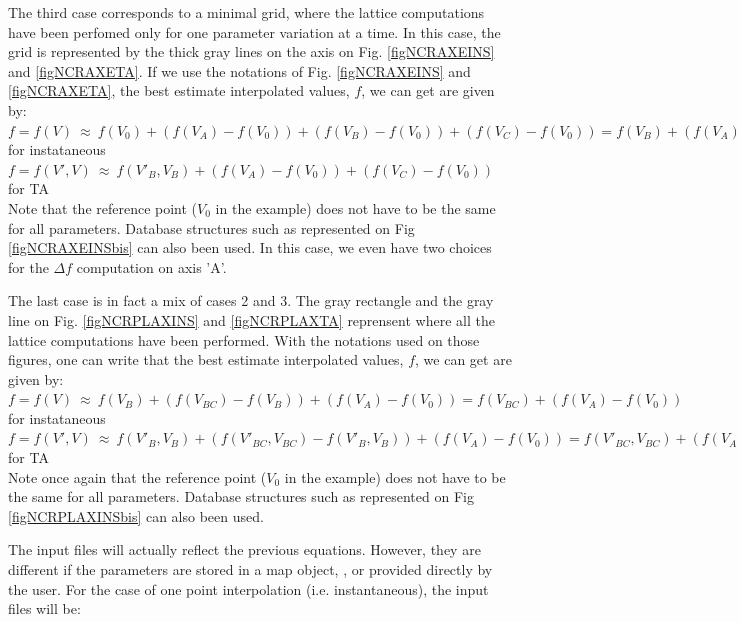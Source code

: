 The third case corresponds to a minimal grid, where the lattice computations have been perfomed only for one parameter variation at a time. In this case, the grid is represented by the thick gray lines on the axis on Fig. \ref{figNCRAXEINS} and \ref{figNCRAXETA}. If we use the notations of Fig. \ref{figNCRAXEINS} and \ref{figNCRAXETA}, the best estimate interpolated values, $f$, we can get are given by: \\
$f=f(V)~\approx~f(V_0)+(f(V_A)-f(V_0))+(f(V_B)-f(V_0))+(f(V_C)-f(V_0))=f(V_B)+(f(V_A)-f(V_0))+(f(V_C)-f(V_0))$ for instataneous\\
$f=f(V',V)~\approx~f(V'_B,V_B)+(f(V_A)-f(V_0))+(f(V_C)-f(V_0))$ for TA\\
Note that the reference point ($V_0$ in the example) does not have to be the same for all parameters. Database structures such as represented on Fig \ref{figNCRAXEINSbis} can also been used. In this case, we even have two choices for the $\Delta f$ computation on axis 'A'. 

The last case is in fact a mix of cases 2 and 3. The gray rectangle and the gray line on Fig. \ref{figNCRPLAXINS} and \ref{figNCRPLAXTA} reprensent where all the lattice computations have been performed. With the notations used on those figures, one can write that the best estimate interpolated values, $f$, we can get are given by: \\
$f=f(V)~\approx~f(V_B)+(f(V_{BC})-f(V_B))+(f(V_A)-f(V_0))=f(V_{BC})+(f(V_A)-f(V_0))$ for instataneous\\
$f=f(V',V)~\approx~f(V'_B,V_B)+(f(V'_{BC},V_{BC})-f(V'_B,V_B))+(f(V_A)-f(V_0))=f(V'_{BC},V_{BC})+(f(V_A)-f(V_0))$ for TA\\
Note once again that the reference point ($V_0$ in the example) does not have to be the same for all parameters. Database structures such as represented on Fig \ref{figNCRPLAXINSbis} can also been used.
\clearpage

The input files will actually reflect the previous equations. However, they are different if the parameters are stored in a {\sc map} object, , or provided directly by the user. For the case of one point interpolation (i.e. instantaneous), the input files will be: \\

